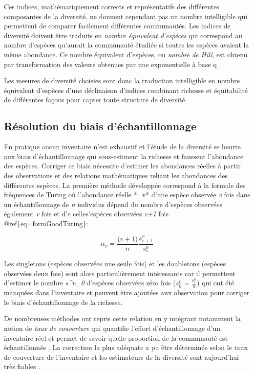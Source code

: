 \documentclass[
  11pt,
  french,
  A4paper,
  extrafontsizes,onecolumn,openright
  ]{memoir}
\begin{document}
Ces indices, mathématiquement corrects et représentatifs des différentes
composantes de la diversité, ne donnent cependant pas un nombre
intelligible qui permettent de comparer facilement différentes
communautés. Les indices de diversité doivent être traduits en
\emph{nombre équivalent d'espèces} qui correspond au nombre d'espèces
qu'aurait la communauté étudiée si toutes les espèces avaient la même
abondance. Ce nombre équivalent d'espèces, ou \emph{nombre de Hill}, est
obtenu par transformation des valeurs obtenues par une exponentielle à
base q \autocite{Hill1973}.

Les mesures de diversité choisies sont donc la traduction intelligible
en nombre équivalent d'espèces d'une déclinaison d'indices combinant
richesse et équitabilité de différentes façons pour capter toute
structure de diversité.

\subsection{Résolution du biais
d'échantillonnage}\label{resolution-du-biais-dechantillonnage}

En pratique aucun inventaire n'est exhaustif et l'étude de la diversité
se heurte aux biais d'échantillonnage qui sous-estiment la richesse et
faussent l'abondance des espèces. Corriger ce biais nécessite d'estimer
les abondances réelles à partir des observations et des relations
mathématiques reliant les abondances des différentes espèces. La
première méthode développée correspond à la formule des fréquences de
Turing \autocite{Good1953} où l'abondance réelle *\alpha\_v* d'une
espèce observée \emph{v} fois dans un échantillonnage de \emph{n}
individus dépend du nombre d'espèces observées également \emph{v} fois
et d'e celles'espèces observées \emph{v+1} fois
@ref\{eq=formGoodTuring\}:

\begin{equation}
\alpha_v=\frac{\big(v+1\big)}{n}\frac{s^n_{v+1}}{s^n_v}
\label{eq:formGoodTuring}
\end{equation}

Les singletons (espèces observées une seule fois) et les doubletons
(espèces observées deux fois) sont alors particulièrement intéressants
car il permettent d'estimer le nombre \emph{s\^{}n\_0} d'espèces
observées zéro fois (\(s^n_0=\frac{s^n_1}{n}\)) qui ont été manquées
dans l'inventaire et peuvent être ajoutées aux observation pour corriger
le biais d'échantillonnage de la richesse.

De nombreuses méthodes ont repris cette relation en y intégrant
notamment la notion de \emph{taux de couverture} qui quantifie l'effort
d'échantillonnage d'un inventaire réel et permet de savoir quelle
proportion de la communauté est échantillonnée \autocite{Dauby2012}. La
correction la plus adéquate a pu être déterminée selon le taux de
couverture de l'inventaire et les estimateurs de la diversité sont
aujourd'hui très fiables \autocites{Chao2015}{Marcon2015b}.
\end{document}
